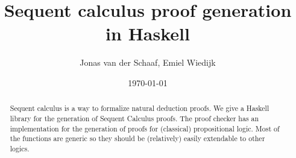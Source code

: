 \documentclass[12pt,a4paper]{article}
\title{Sequent calculus proof generation in Haskell}
\author{Jonas van der Schaaf, Emiel Wiedijk}
\date{\today}
\begin{document}
\maketitle

\begin{abstract}
    Sequent calculus is a way to formalize natural deduction proofs. We give a
    Haskell library for the generation of Sequent Calculus proofs. The proof checker
    has an implementation for the generation of proofs for (classical) propositional
    logic. Most of the functions are generic so they should be (relatively) easily
    extendable to other logics.
\end{abstract}

\newpage
\tableofcontents

\clearpage






\cite{Knuth11CombAlg}



\end{document}

